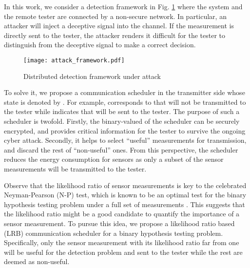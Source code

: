\documentclass[journal]{IEEEtran}
\begin{document}
In this work,  we consider a detection framework in Fig. \ref{fig1} where the system and the remote tester are connected by a non-secure network. In particular, an attacker will inject a deceptive signal  into the channel.  If the measurement  is directly sent to the tester, the attacker renders it difficult for the tester to distinguish from the deceptive signal to make a correct decision.
\begin{figure}
  \centering
  \texttt{[image: attack\_framework.pdf]}
    \caption{ Distributed detection framework under attack}
  \label{fig1}
\end{figure}
To solve it, we propose a communication scheduler in the transmitter side whose state is denoted by . For example,  corresponds to that  will not be transmitted to the tester while  indicates that   will be sent to the tester.  The purpose of such a scheduler is twofold. Firstly, the binary-valued  of the scheduler can be securely encrypted, and provides critical information for the tester to survive the ongoing cyber attack. Secondly,  it helps to select ``useful'' measurements for transmission, and discard the rest of ``non-useful'' ones. From this perspective, the scheduler reduces the energy consumption for sensors as only a subset of the sensor measurements will be transmitted to the tester.





Observe that the likelihood ratio of sensor measurements is key to the celebrated Neyman-Pearson (N-P) test, which is known to be an optimal test for the binary hypothesis testing problem under a full set of measurements \cite{casella2001statistical}. This suggests that the likelihood ratio might be a good candidate to quantify the importance of a sensor measurement. To pursue this idea, we propose a  likelihood ratio based (LRB) communication scheduler for a binary hypothesis testing problem. Specifically, only the sensor measurement with its likelihood ratio far from one will be useful for the detection problem and sent to the tester while the rest are deemed as non-useful.
\end{document}
